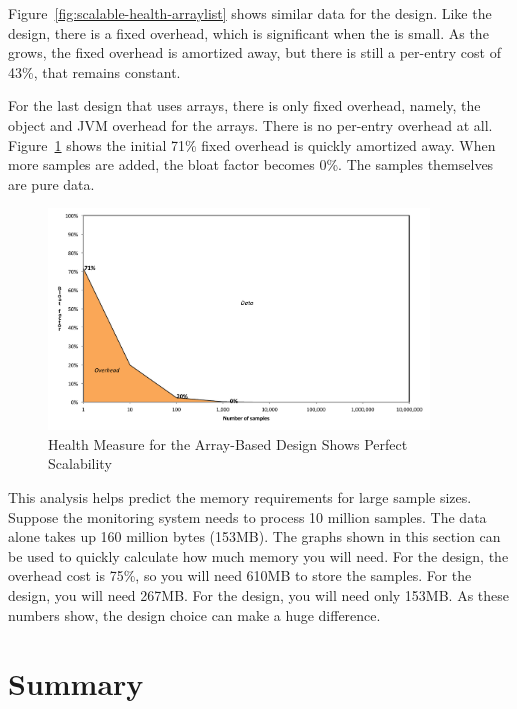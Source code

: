Figure~\ref{fig:scalable-health-arraylist} shows similar data for the
 design. Like the  design, there is a fixed
overhead, which is significant when the  is small. As the
 grows, the fixed overhead is amortized away, but there is still
a per-entry cost of 43\%, that remains constant.

For the last design that uses arrays, there is only fixed overhead, namely, the
 object and JVM overhead for the arrays. There is no per-entry
overhead at all. Figure~\ref{fig:scalable-health-array} shows the initial 71\%
fixed overhead is quickly amortized away. When more samples are added, the bloat
factor becomes 0\%. The samples themselves are pure data.

\begin{figure}
  \centering
  \includegraphics[width=0.9\textwidth]{part1/Figures/memoryhealth/scalable-health-array}
  \caption{Health Measure for the Array-Based Design Shows Perfect Scalability}
  \label{fig:scalable-health-array}
\end{figure}

This analysis helps predict the memory requirements for large sample sizes.
Suppose the monitoring system needs to process 10 million samples. The data
alone takes up 160 million bytes (153MB).  The graphs shown in this section can
be used to quickly calculate how much memory you will need. For the
 design, the overhead cost is 75\%, so you will need 610MB to
store the samples. For the  design, you will need 267MB. For the
 design, you will need only 153MB. As these numbers show, the design
choice can make a huge difference.

\section{Summary}

